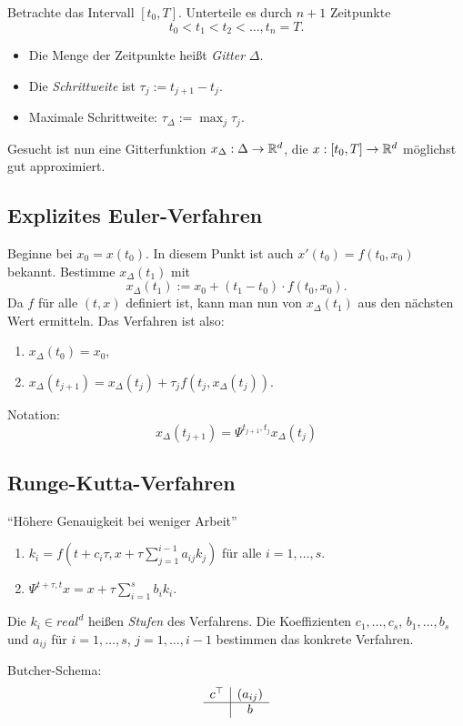 \documentclass[
 a4paper,
 12pt,
 parskip=half
 ]{scrreprt}
\theoremstyle{plain}
\theoremstyle{definition}
\numberwithin{rmrk}{chapter}
\numberwithin{defn}{chapter}
\numberwithin{exmp}{chapter}
\numberwithin{prgp}{subsection}
\numberwithin{equation}{chapter}
\begin{document}
Betrachte das Intervall $[t_0, T]$. Unterteile es durch $n+1$ Zeitpunkte
\[ t_0 < t_1 < t_2 < \ldots, t_n = T. \]
\begin{itemize}
\item Die Menge der Zeitpunkte heißt \emph{Gitter} $\Delta$.
\item Die \emph{Schrittweite} ist $\tau_j := t_{j+1} - t_j$.
\item Maximale Schrittweite: $\tau_\Delta := \max_{j} \tau_j$.
\end{itemize}
Gesucht ist nun eine Gitterfunktion $x_\Delta : \Delta \to \mathbb{R}^d$, die $x :
[t_0, T] \to \mathbb{R}^d$ möglichst gut approximiert.

\subsection{Explizites Euler-Verfahren}
Beginne bei $x_0 = x(t_0)$. In diesem Punkt ist auch $x'(t_0) = f(t_0, x_0)$
bekannt. Bestimme $x_\Delta(t_1)$ mit
\[ x_\Delta(t_1) := x_0 + (t_1 - t_0) \cdot f(t_0, x_0). \]
Da $f$ für alle $(t,x)$ definiert ist, kann man nun von $x_\Delta(t_1)$ aus
den nächsten Wert ermitteln. Das Verfahren ist also:
\begin{enumerate}
\item $x_\Delta(t_0) = x_0$,
\item $x_\Delta(t_{j+1}) = x_\Delta( t_j ) + \tau_j f(t_j, x_\Delta(t_j))$.
\end{enumerate}

Notation:
\[ x_\Delta(t_{j+1}) = \Psi^{t_{j+1},t_j} x_\Delta(t_j) \]

\subsection{Runge-Kutta-Verfahren}
``Höhere Genauigkeit bei weniger Arbeit''
\begin{enumerate}
\item $k_i = f(t + c_i \tau, x + \tau \sum_{j=1}^{i-1} a_{ij} k_j)$ für alle $i =
  1, \ldots, s$.
\item $\Psi^{t+\tau, t} x = x + \tau \sum_{i=1}^s b_i k_i$.
\end{enumerate}
Die $k_i \in real^d$ heißen \emph{Stufen} des Verfahrens. Die Koeffizienten
$c_1, \ldots, c_s$, $b_1, \ldots, b_s$ und $a_{ij}$ für $i = 1, \ldots, s$, $j =
1, \ldots, i-1$ bestimmen das konkrete Verfahren.

Butcher-Schema:
\[ \begin{array}{r|c}
    c^\top & (a_{ij}) \\
    \hline
    & b
  \end{array}
\]
\end{document}
